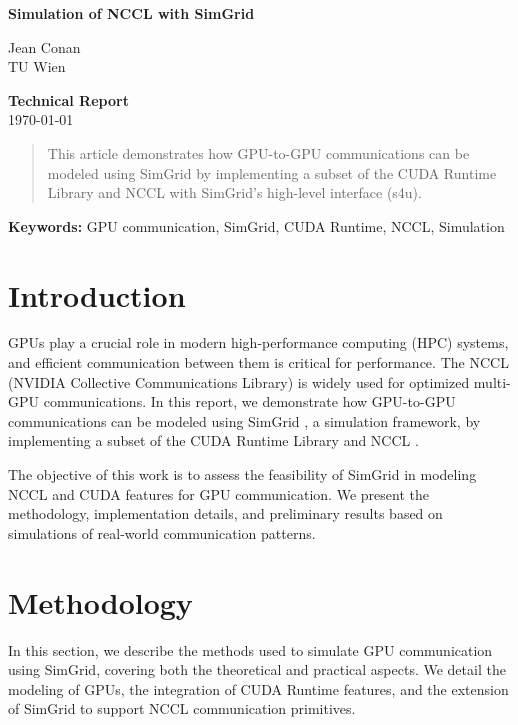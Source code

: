 \documentclass[11pt,a4paper]{article}
\begin{document}
\begin{titlepage}
    \centering
    \vspace*{2cm}
    \Huge
    \textbf{Simulation of NCCL with SimGrid}
    
    \vspace{0.5cm}
    \Large
    Jean Conan \\
    TU Wien
    
    \vfill
    \Large
    \textbf{Technical Report} \\
    \vspace{0.5cm}
    \today
    \vspace{2cm}
\end{titlepage}

\maketitle

\begin{abstract}
This article demonstrates how GPU-to-GPU communications can be modeled using SimGrid by 
implementing a subset of the CUDA Runtime Library and NCCL with SimGrid's high-level interface (s4u).
\end{abstract}

\textbf{Keywords:} GPU communication, SimGrid, CUDA Runtime, NCCL, Simulation

\section{Introduction}
GPUs play a crucial role in modern high-performance computing (HPC) systems, and efficient 
communication between them is critical for performance. The NCCL (NVIDIA Collective Communications Library) 
is widely used for optimized multi-GPU communications. In this report, we demonstrate how GPU-to-GPU 
communications can be modeled using SimGrid \cite{simgrid}, a simulation framework, by implementing a subset of the 
CUDA Runtime Library \cite{cudart} and NCCL \cite{nccllib}.

The objective of this work is to assess the feasibility of SimGrid in modeling NCCL and CUDA features for GPU communication. We present the methodology, implementation details, and preliminary results based on simulations of real-world communication patterns.


\printglossary

\section{Methodology}
In this section, we describe the methods used to simulate GPU communication 
using SimGrid, covering both the theoretical and practical aspects. We detail 
the modeling of GPUs, the integration of CUDA Runtime features, and the extension 
of SimGrid to support NCCL communication primitives.
\end{document}
